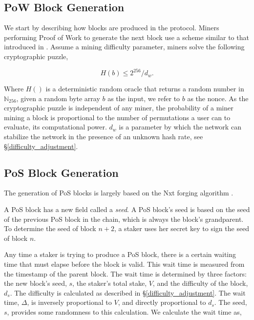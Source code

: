\subsection{PoW Block Generation}
\label{pow_block_generation}

We start by describing how blocks are produced in the protocol. Miners performing Proof of Work to generate the next block use a scheme similar to that introduced in \cite{wood2014ethereum}. Assume a mining difficulty parameter, miners solve the following cryptographic puzzle,

\begin{equation}
\label{eq:pow_puzzle_equation}
H(b) \leq 2^{256} / d_w.
\end{equation}

Where $H()$ is a deterministic random oracle that returns a random number in $\mathbb{N}_{256}$, given a random byte array $b$ as the input, we refer to $b$ as the nonce. As the cryptographic puzzle is independent of any miner, the probability of a miner mining a block is proportional to the number of permutations a user can to evaluate, its computational power. $d_w$ is a parameter by which the network can stabilize the network in the presence of an unknown hash rate, see \S\ref{difficulty_adjustment}.

\subsection{PoS Block Generation}
\label{pos_block_generation}

The generation of PoS blocks is largely based on the Nxt forging algorithm \cite{popov2016probabilistic}. 

A PoS block has a new field called a \emph{seed}. A PoS block's seed is based on the seed of the previous PoS block in the chain, which is always the block's grandparent. To determine the seed of block $n + 2$, a staker uses her secret key to sign the seed of block $n$.

Any time a staker is trying to produce a PoS block, there is a certain waiting time that must elapse before the block is valid. This wait time is measured from the timestamp of the parent block. The wait time is determined by three factors: the new block's seed, $s$, the staker's total stake, $V$, and the difficulty of the block, $d_s$. The difficulty is calculated as described in \S\ref{difficulty_adjustment}. The wait time, $\Delta$, is inversely proportional to $V$, and directly proportional to $d_s$. The seed, $s$, provides some randomness to this calculation. We calculate the wait time as,

